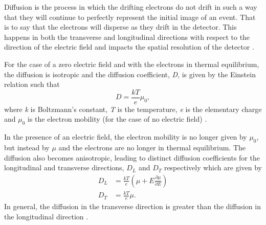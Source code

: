 Diffusion is the process in which the drifting electrons do not drift in such a way that they will continue to perfectly represent the initial image of an event. That is to say that the electrons will disperse as they drift in the detector. This happens in both the transverse and longitudinal directions with respect to the direction of the electric field and impacts the spatial resolution of the detector \cite{LArTPC_book}. 

For the case of a zero electric field and with the electrons in thermal equilibrium, the diffusion is isotropic and the diffusion coefficient, \textit{D}, is given by the Einstein relation such that
\begin{equation}
    D = \frac{kT}{e}\mu_0,
\end{equation}
where \textit{k} is Boltzmann's constant, \textit{T} is the temperature, \textit{e} is the elementary charge and $\mu_0$ is the electron mobility (for the case of no electric field) \cite{LArTPC_book}.

In the presence of an electric field, the electron mobility is no longer given by $\mu_0$, but instead by $\mu$ and the electrons are no longer in thermal equilibrium. The diffusion also becomes anisotropic, leading to distinct diffusion coefficients for the longitudinal and transverse directions, $D_L$ and $D_T$ respectively which are given by
\begin{equation}
\begin{split}
    D_L &= \frac{kT}{e}(\mu + E \frac{\partial \mu}{\partial E}) \\
    D_T &= \frac{kT}{e}\mu.
\end{split}
\end{equation}
In general, the diffusion in the transverse direction is greater than the diffusion in the longitudinal direction \cite{LArTPC_book} \cite{diffusion}.

